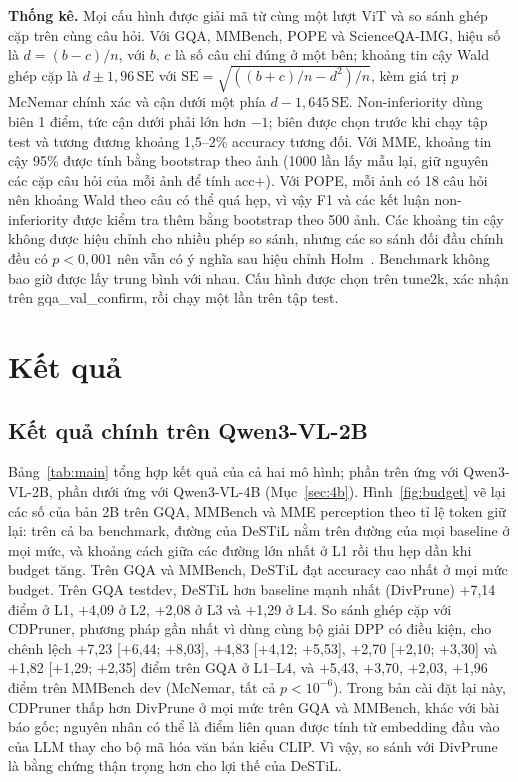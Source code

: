 \documentclass[conference]{IEEEtran}
\newcommand{\pl}{\ensuremath{+}}
\begin{document}
\textbf{Thống kê.} Mọi cấu hình được giải mã từ cùng một lượt ViT và so sánh ghép cặp trên cùng câu hỏi. Với GQA, MMBench, POPE và ScienceQA-IMG, hiệu số là $d=(b-c)/n$, với $b$, $c$ là số câu chỉ đúng ở một bên; khoảng tin cậy Wald ghép cặp là $d\pm1{,}96\,\mathrm{SE}$ với $\mathrm{SE}=\sqrt{((b+c)/n-d^2)/n}$, kèm giá trị $p$ McNemar chính xác và cận dưới một phía $d-1{,}645\,\mathrm{SE}$. Non-inferiority dùng biên 1 điểm, tức cận dưới phải lớn hơn $-1$; biên được chọn trước khi chạy tập test và tương đương khoảng 1,5--2\% accuracy tương đối. Với MME, khoảng tin cậy 95\% được tính bằng bootstrap theo ảnh (1000 lần lấy mẫu lại, giữ nguyên các cặp câu hỏi của mỗi ảnh để tính acc$+$). Với POPE, mỗi ảnh có 18 câu hỏi nên khoảng Wald theo câu có thể quá hẹp, vì vậy F1 và các kết luận non-inferiority được kiểm tra thêm bằng bootstrap theo 500 ảnh. Các khoảng tin cậy không được hiệu chỉnh cho nhiều phép so sánh, nhưng các so sánh đối đầu chính đều có $p<0{,}001$ nên vẫn có ý nghĩa sau hiệu chỉnh Holm~\cite{holm1979}. Benchmark không bao giờ được lấy trung bình với nhau. Cấu hình được chọn trên tune2k, xác nhận trên gqa\_val\_confirm, rồi chạy một lần trên tập test.

\section{Kết quả}
\label{sec:results}

\subsection{Kết quả chính trên Qwen3-VL-2B}

Bảng~\ref{tab:main} tổng hợp kết quả của cả hai mô hình; phần trên ứng với Qwen3-VL-2B, phần dưới ứng với Qwen3-VL-4B (Mục~\ref{sec:4b}). Hình~\ref{fig:budget} vẽ lại các số của bản 2B trên GQA, MMBench và MME perception theo tỉ lệ token giữ lại: trên cả ba benchmark, đường của DeSTiL nằm trên đường của mọi baseline ở mọi mức, và khoảng cách giữa các đường lớn nhất ở L1 rồi thu hẹp dần khi budget tăng. Trên GQA và MMBench, DeSTiL đạt accuracy cao nhất ở mọi mức budget. Trên GQA testdev, DeSTiL hơn baseline mạnh nhất (DivPrune) \pl7,14 điểm ở L1, \pl4,09 ở L2, \pl2,08 ở L3 và \pl1,29 ở L4. So sánh ghép cặp với CDPruner, phương pháp gần nhất vì dùng cùng bộ giải DPP có điều kiện, cho chênh lệch \pl7,23 [\pl6,44; \pl8,03], \pl4,83 [\pl4,12; \pl5,53], \pl2,70 [\pl2,10; \pl3,30] và \pl1,82 [\pl1,29; \pl2,35] điểm trên GQA ở L1--L4, và \pl5,43, \pl3,70, \pl2,03, \pl1,96 điểm trên MMBench dev (McNemar, tất cả $p<10^{-6}$). Trong bản cài đặt lại này, CDPruner thấp hơn DivPrune ở mọi mức trên GQA và MMBench, khác với bài báo gốc; nguyên nhân có thể là điểm liên quan được tính từ embedding đầu vào của LLM thay cho bộ mã hóa văn bản kiểu CLIP. Vì vậy, so sánh với DivPrune là bằng chứng thận trọng hơn cho lợi thế của DeSTiL.
\end{document}
